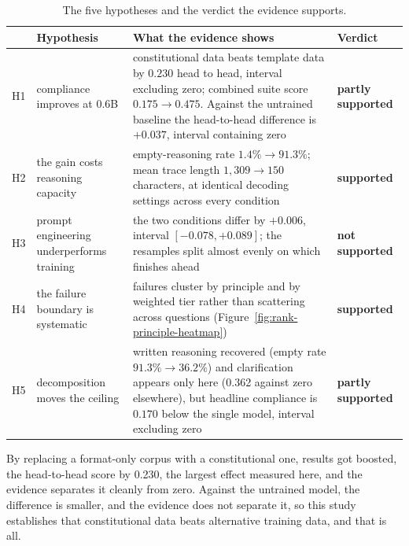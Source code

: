 \begin{table}[htbp]
  \centering\small
  \caption[The five hypotheses and the verdict the evidence supports]{The five hypotheses and the verdict the evidence supports.}
  \label{tab:hypothesis-verdicts}
  \begin{tabular}{@{}lL{3.5cm}L{7.8cm}l@{}}
    \toprule
    & Hypothesis & What the evidence shows & Verdict \\
    \midrule
    H1 & compliance improves at 0.6B
       & constitutional data beats template data by $0.230$ head to head, interval excluding zero; combined suite score $0.175 \to 0.475$. Against the untrained baseline the head-to-head difference is $+0.037$, interval containing zero
       & \textbf{partly supported} \\
    \addlinespace
    H2 & the gain costs reasoning capacity
       & empty-reasoning rate $1.4\% \to 91.3\%$; mean trace length $1{,}309 \to 150$ characters, at identical decoding settings across every condition
       & \textbf{supported} \\
    \addlinespace
    H3 & prompt engineering underperforms training
       & the two conditions differ by $+0.006$, interval $[-0.078, +0.089]$; the resamples split almost evenly on which finishes ahead
       & \textbf{not supported} \\
    \addlinespace
    H4 & the failure boundary is systematic
       & failures cluster by principle and by weighted tier rather than scattering across questions (Figure~\ref{fig:rank-principle-heatmap})
       & \textbf{supported} \\
    \addlinespace
    H5 & decomposition moves the ceiling
       & written reasoning recovered (empty rate $91.3\% \to 36.2\%$) and clarification appears only here (0.362 against zero elsewhere), but headline compliance is $0.170$ below the single model, interval excluding zero
       & \textbf{partly supported} \\
    \bottomrule
  \end{tabular}
\end{table}

By replacing a format-only corpus with a constitutional one, results got boosted, the head-to-head score by 0.230, the largest effect measured here, and the evidence separates it cleanly from zero. Against the untrained model, the difference is smaller, and the evidence does not separate it, so this study establishes that constitutional data beats alternative training data, and that is all.

